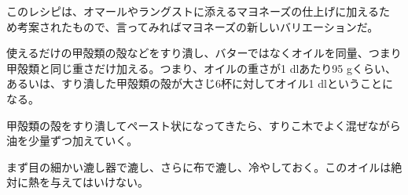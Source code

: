 \begin{recette}


このレシピは、オマールやラングストに添えるマヨネーズの仕上げに加えるた
め考案されたもので、言ってみればマヨネーズの新しいバリエーションだ。

使えるだけの甲殻類の殻などをすり潰し、バターではなくオイルを同量、つまり甲殻類と同じ重さだけ加える。つまり、オイルの重さが1
dlあたり95
gくらい、あるいは、すり潰した甲殻類の殻が大さじ6杯に対してオイル1
dlということになる。

甲殻類の殻をすり潰してペースト状になってきたら、すりこ木でよく混ぜながら油を少量ずつ加えていく。

まず目の細かい漉し器で漉し、さらに布で漉し、冷やしておく。このオイルは絶対に熱を与えてはいけない。
\end{recette}